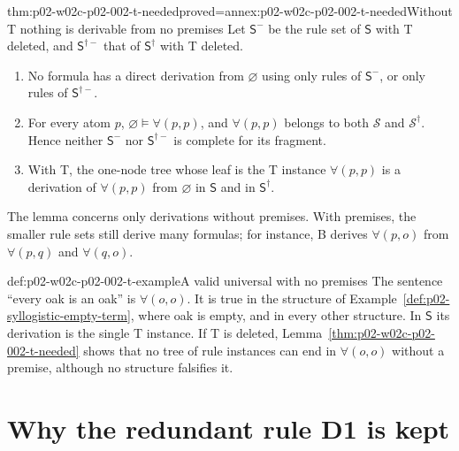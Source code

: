 \begin{hblemma}{thm:p02-w02c-p02-002-t-needed}{proved=annex:p02-w02c-p02-002-t-needed}{Without T nothing is derivable from no premises}
Let \(\mathsf S^-\) be the rule set of \(\mathsf S\) with T deleted, and
\(\mathsf S^{\dagger-}\) that of \(\mathsf S^\dagger\) with T deleted.
\begin{enumerate}
\item No formula has a direct derivation from \(\varnothing\) using only
 rules of \(\mathsf S^-\), or only rules of \(\mathsf S^{\dagger-}\).
\item For every atom \(p\), \(\varnothing\models\forall(p,p)\), and
 \(\forall(p,p)\) belongs to both \(\mathcal S\) and \(\mathcal S^\dagger\).
 Hence neither \(\mathsf S^-\) nor \(\mathsf S^{\dagger-}\) is complete for
 its fragment.
\item With T, the one-node tree whose leaf is the T instance
 \(\forall(p,p)\) is a derivation of \(\forall(p,p)\) from \(\varnothing\)
 in \(\mathsf S\) and in \(\mathsf S^\dagger\).
\end{enumerate}
\end{hblemma}

The lemma concerns only derivations without premises. With premises, the
smaller rule sets still derive many formulas; for instance, B derives
\(\forall(p,o)\) from \(\forall(p,q)\) and \(\forall(q,o)\).

\begin{hbexample}{def:p02-w02c-p02-002-t-example}{A valid universal with no premises}
The sentence ``every oak is an oak'' is \(\forall(o,o)\). It is true in the
structure of Example~\ref{def:p02-syllogistic-empty-term}, where oak is
empty, and in every other structure. In \(\mathsf S\) its derivation is the
single T instance. If T is deleted, Lemma~\ref{thm:p02-w02c-p02-002-t-needed}
shows that no tree of rule instances can end in \(\forall(o,o)\) without a
premise, although no structure falsifies it.
\end{hbexample}

\section{Why the redundant rule D1 is kept}
\label{sec:p02-w02c-p02-002-d1}


